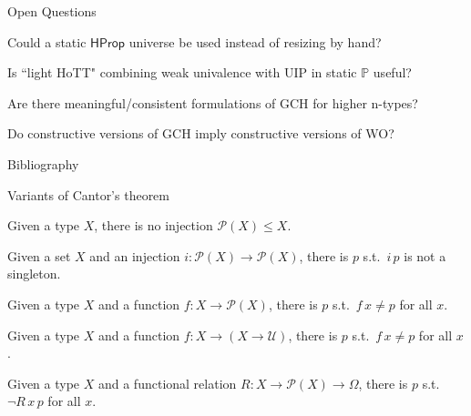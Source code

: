\documentclass[xcolor=dvipsnames,compress,aspectratio=169]{beamer}
\newcommand{\MBB}[1]{\ensuremath{\mathbb{#1}}\xspace}  %
\newcommand{\MCL}[1]{\ensuremath{\mathcal{#1}}\xspace} %
\newcommand{\Pow}{\MCL P}
\newcommand{\Prop}{\MBB P}
\begin{document}
\begin{frame}{Open Questions}
	\begin{centering}
		\begin{widerbox}
		\center
		Could a static $\mathsf{HProp}$ universe be used instead of resizing by hand?
		\end{widerbox}
		\pause
		\vspace{0.3cm}
		\begin{widerbox}
		\center
		Is ``light HoTT" combining weak univalence with UIP in static $\Prop$ useful?
		\end{widerbox}
		\pause
		\vspace{0.3cm}
		\begin{widerbox}
		\center
		Are there meaningful/consistent formulations of GCH for higher n-types?
		\end{widerbox}
		\pause
		\vspace{0.3cm}
		\begin{widerbox}
		\center
		Do constructive versions of GCH imply constructive versions of WO?
		\end{widerbox}
	\end{centering}
\end{frame}



\begin{frame}{Bibliography}
\footnotesize


\end{frame}

\begin{frame}{Variants of Cantor's theorem}
\begin{fact}
	Given a type $X$, there is no injection $\Pow(X)\le X$.
\end{fact}
\vspace{-0.1cm}
\begin{fact}
	Given a set $X$ and an injection $i:\Pow(X)\to\Pow(X)$, there is $p$ s.t.\ $i\,p$ is not a singleton.
\end{fact}
\vspace{-0.1cm}
\begin{fact}
	Given a type $X$ and a function $f:X\to \Pow(X)$, there is $p$ s.t.\ $f\,x\not = p$ for all $x$.
\end{fact}
\vspace{-0.1cm}
\begin{fact}
	Given a type $X$ and a function $f:X\to (X \to \mathcal U)$, there is $p$ s.t.\ $f\,x\not = p$ for all $x$.
\end{fact}
\vspace{-0.1cm}
\begin{fact}
	Given a type $X$ and a functional relation $R:X\to \Pow(X)\to\Omega$, there is $p$ s.t.\ $\neg R\,x\,p$ for all $x$.
\end{fact}
\end{frame}
\end{document}
